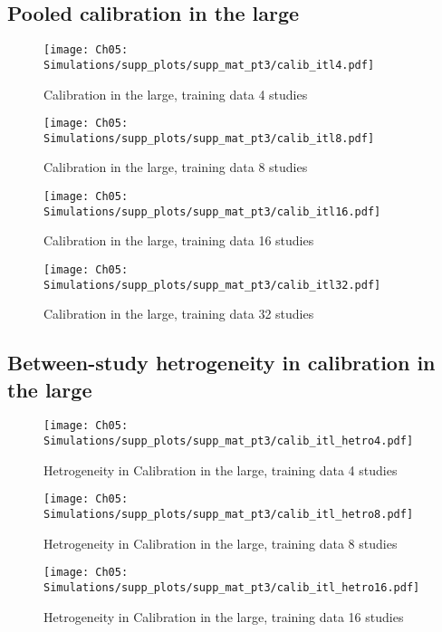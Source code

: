 
\subsection{Pooled calibration in the large}
\begin{figure}[H]
  \centering
  \texttt{[image: Ch05: Simulations/supp\_plots/supp\_mat\_pt3/calib\_itl4.pdf]}
  \caption{Calibration in the large, training data 4 studies}
\end{figure}

\begin{figure}[H]
  \centering
  \texttt{[image: Ch05: Simulations/supp\_plots/supp\_mat\_pt3/calib\_itl8.pdf]}
  \caption{Calibration in the large, training data 8 studies}
\end{figure}

\begin{figure}[H]
  \centering
  \texttt{[image: Ch05: Simulations/supp\_plots/supp\_mat\_pt3/calib\_itl16.pdf]}
  \caption{Calibration in the large, training data 16 studies}
\end{figure}

\begin{figure}[H]
  \centering
  \texttt{[image: Ch05: Simulations/supp\_plots/supp\_mat\_pt3/calib\_itl32.pdf]}
  \caption{Calibration in the large, training data 32 studies}
\end{figure}

\subsection{Between-study hetrogeneity in calibration in the large}
\begin{figure}[H]
  \centering
  \texttt{[image: Ch05: Simulations/supp\_plots/supp\_mat\_pt3/calib\_itl\_hetro4.pdf]}
  \caption{Hetrogeneity in Calibration in the large, training data 4 studies}
\end{figure}

\begin{figure}[H]
  \centering
  \texttt{[image: Ch05: Simulations/supp\_plots/supp\_mat\_pt3/calib\_itl\_hetro8.pdf]}
  \caption{Hetrogeneity in Calibration in the large, training data 8 studies}
\end{figure}

\begin{figure}[H]
  \centering
  \texttt{[image: Ch05: Simulations/supp\_plots/supp\_mat\_pt3/calib\_itl\_hetro16.pdf]}
  \caption{Hetrogeneity in Calibration in the large, training data 16 studies}
\end{figure}

